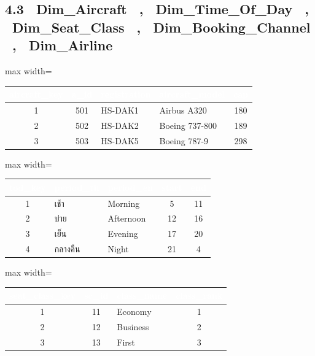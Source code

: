 \documentclass[11pt]{article}
\begin{document}
\subsection*{4.3 \ Dim_Aircraft \ , \ Dim_Time_Of_Day \ , \ Dim_Seat_Class \ , \ Dim_Booking_Channel \ , \ Dim_Airline}
{\footnotesize
\begin{minipage}[t]{0.49\linewidth}
\begin{adjustbox}{max width=\linewidth}
\begin{tabular}{@{}c c l l c@{}}
\toprule
\rowcolor{tblHead}
\textcolor{white}{aircraft_key} & \textcolor{white}{a_id} & \textcolor{white}{registration} &
\textcolor{white}{aircraft_model} & \textcolor{white}{cap}\\
\midrule
1 & 501 & HS-DAK1 & Airbus A320    & 180\\
2 & 502 & HS-DAK2 & Boeing 737-800 & 189\\
3 & 503 & HS-DAK5 & Boeing 787-9   & 298\\
\bottomrule
\end{tabular}
\end{adjustbox}
\vspace{6pt}

\begin{adjustbox}{max width=\linewidth}
\begin{tabular}{@{}c l l c c@{}}
\toprule
\rowcolor{tblHead}
\textcolor{white}{tod_key} & \textcolor{white}{period_th} & \textcolor{white}{period_en} &
\textcolor{white}{start} & \textcolor{white}{end}\\
\midrule
1 & เช้า     & Morning   & 5  & 11\\
2 & บ่าย     & Afternoon & 12 & 16\\
3 & เย็น     & Evening   & 17 & 20\\
4 & กลางคืน & Night     & 21 & 4\\
\bottomrule
\end{tabular}
\end{adjustbox}
\end{minipage}\hfill
\begin{minipage}[t]{0.49\linewidth}
\begin{adjustbox}{max width=\linewidth}
\begin{tabular}{@{}c c l c@{}}
\toprule
\rowcolor{tblHead}
\textcolor{white}{seat_class_key} & \textcolor{white}{sc_id} & \textcolor{white}{class_name} &
\textcolor{white}{class_rank}\\
\midrule
1 & 11 & Economy  & 1\\
2 & 12 & Business & 2\\
3 & 13 & First    & 3\\
\bottomrule
\end{tabular}
\end{adjustbox}
\vspace{6pt}


\end{minipage}}
\end{document}
